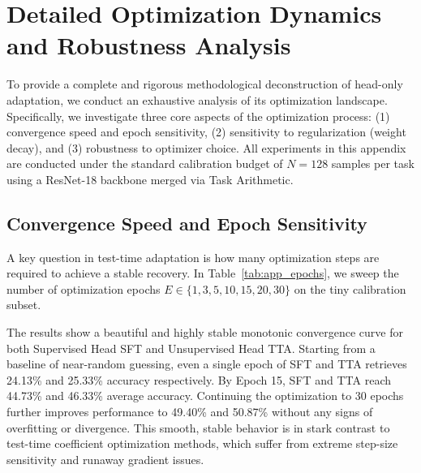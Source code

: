 \documentclass{article}
\theoremstyle{plain}
\theoremstyle{definition}
\theoremstyle{remark}
\begin{document}



\clearpage
\appendix
\onecolumn
\section{Detailed Optimization Dynamics and Robustness Analysis}
\label{appendix:optimization_dynamics}

To provide a complete and rigorous methodological deconstruction of head-only adaptation, we conduct an exhaustive analysis of its optimization landscape. Specifically, we investigate three core aspects of the optimization process: (1) convergence speed and epoch sensitivity, (2) sensitivity to regularization (weight decay), and (3) robustness to optimizer choice. All experiments in this appendix are conducted under the standard calibration budget of $N = 128$ samples per task using a ResNet-18 backbone merged via Task Arithmetic.

\subsection{Convergence Speed and Epoch Sensitivity}
A key question in test-time adaptation is how many optimization steps are required to achieve a stable recovery. In Table~\ref{tab:app_epochs}, we sweep the number of optimization epochs $E \in \{1, 3, 5, 10, 15, 20, 30\}$ on the tiny calibration subset. 

The results show a beautiful and highly stable monotonic convergence curve for both Supervised Head SFT and Unsupervised Head TTA. Starting from a baseline of near-random guessing, even a single epoch of SFT and TTA retrieves 24.13\% and 25.33\% accuracy respectively. By Epoch 15, SFT and TTA reach 44.73\% and 46.33\% average accuracy. Continuing the optimization to 30 epochs further improves performance to 49.40\% and 50.87\% without any signs of overfitting or divergence. This smooth, stable behavior is in stark contrast to test-time coefficient optimization methods, which suffer from extreme step-size sensitivity and runaway gradient issues.
\end{document}
